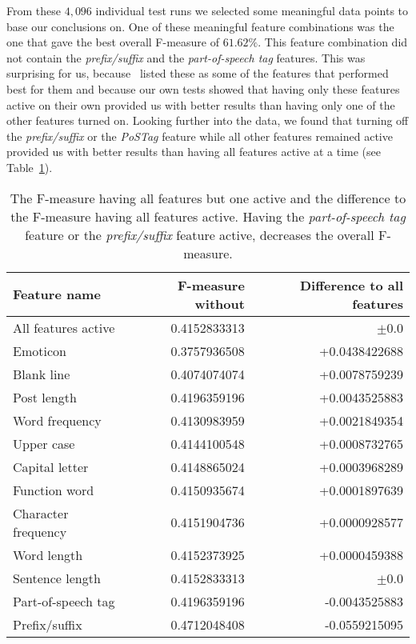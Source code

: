 From these $4,096$ individual test runs we selected some meaningful data points to base our conclusions on.
One of these meaningful feature combinations was the one that gave the best overall F-measure of $61.62\%$.
This feature combination did not contain the \textit{prefix/suffix} and the \textit{part-of-speech tag} features.
This was surprising for us, because~\cite{madigan2005author} listed these as some of the features that performed best for them and because our own tests showed that having only these features active on their own provided us with better results than having only one of the other features turned on.
Looking further into the data, we found that turning off the \textit{prefix/suffix} or the \textit{PoSTag} feature while all other features remained active provided us with better results than having all features active at a time (see Table~\ref{tab:feature_evaluation_1}).

\begin{table}[ht!]
	\begin{center}
    \begin{tabular}{l|r|r}
	Feature name		& F-measure without & Difference to all features \\ \hline \hline
	All features active	& 0.4152833313 & $\pm$0.0 \\ \hline \hline
	Emoticon			& 0.3757936508 & +0.0438422688 \\ \hline
	Blank line			& 0.4074074074 & +0.0078759239 \\ \hline
	Post length			& 0.4196359196 & +0.0043525883 \\ \hline
	Word frequency		& 0.4130983959 & +0.0021849354 \\ \hline
	Upper case			& 0.4144100548 & +0.0008732765 \\ \hline
	Capital letter		& 0.4148865024 & +0.0003968289 \\ \hline
	Function word		& 0.4150935674 & +0.0001897639 \\ \hline
	Character frequency	& 0.4151904736 & +0.0000928577 \\ \hline
	Word length			& 0.4152373925 & +0.0000459388 \\ \hline
	Sentence length		& 0.4152833313 & $\pm$0.0 	   \\ \hline
	Part-of-speech tag				& 0.4196359196 & -0.0043525883 \\ \hline
	Prefix/suffix		& 0.4712048408 & -0.0559215095 \\
    \end{tabular}
    \end{center}
	\caption{The F-measure having all features but one active and the difference to the F-measure having all features active. Having the \textit{part-of-speech tag} feature or the \textit{prefix/suffix} feature active, decreases the overall F-measure.}
	\label{tab:feature_evaluation_1}
\end{table}


